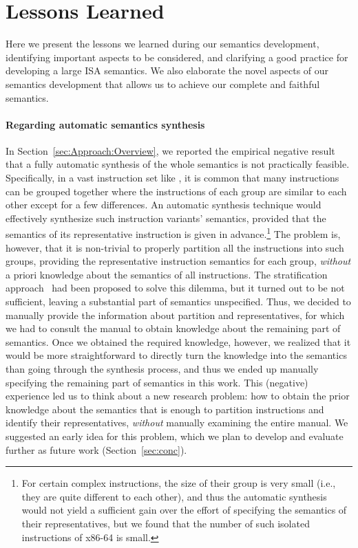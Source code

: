 \section{Lessons Learned}
\label{sec:lesson-learned}

{\color{blue}

Here we present the lessons we learned during our semantics development, identifying important aspects to be considered, and clarifying a good practice for developing a large ISA semantics.
We also elaborate the novel aspects of our semantics development that allows us to achieve our complete and faithful semantics.

\paragraph{Regarding automatic semantics synthesis}

In Section~\ref{sec:Approach:Overview}, we reported the empirical negative result that a fully automatic synthesis of the whole \ISA semantics is not practically feasible.
Specifically, in a vast instruction set like \ISA {}, it is common that many instructions can be grouped together where the instructions of each group are similar to each other except for a few differences.
An automatic synthesis technique would effectively synthesize such instruction variants' semantics, provided that the semantics of its representative instruction is given in advance.\footnote{%
For certain complex instructions, the size of their group is very small (i.e., they are quite different to each other), and thus the automatic synthesis would not yield a sufficient gain over the effort of specifying the semantics of their representatives, but we found that the number of such isolated instructions of x86-64 is small.}
The problem is, however, that it is non-trivial to properly partition all the instructions into such groups, providing the representative instruction semantics for each group, \emph{without} a priori knowledge about the semantics of all instructions.
The stratification approach~\cite{Heule2016a} had been proposed to solve this dilemma, but it turned out to be not sufficient, leaving a substantial part of semantics unspecified.
Thus, we decided to manually provide the information about partition and representatives, for which we had to consult the manual to obtain knowledge about the remaining part of semantics.
Once we obtained the required knowledge, however, we realized that it would be more straightforward to directly turn the knowledge into the semantics than going through the synthesis process, and thus we ended up manually specifying the remaining part of semantics in this work.
%
This (negative) experience led us to think about a new research problem: how to obtain the prior knowledge about the semantics that is enough to partition instructions and identify their representatives, \emph{without} manually examining the entire manual.
We suggested an early idea for this problem, which we plan to develop and evaluate further as future work (Section~\ref{sec:conc}).

}
